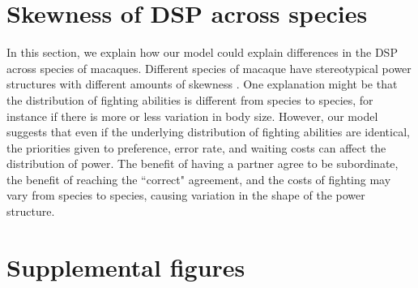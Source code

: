 \documentclass{article}
\begin{document}
\section{Skewness of DSP across species \label{species}}
In this section, we explain how our model could explain differences in the DSP across species of macaques.
Different species of macaque have stereotypical power structures with different amounts of skewness \cite{Flack:2004oq,Preuschoft:2004ly,Waal:1985fk,Thierry:2000ij}.  One explanation might be that the distribution of fighting abilities is different from species to species, for instance if there is more or less variation in body size.  However, our model suggests that even if the underlying distribution of fighting abilities are identical, the priorities given to preference, error rate, and waiting costs can affect the distribution of power.  The benefit of having a partner agree to be subordinate, the benefit of reaching the ``correct" agreement, and the costs of fighting may vary from species to species, causing variation in the shape of the power structure.

\section{Supplemental figures }
\end{document}
